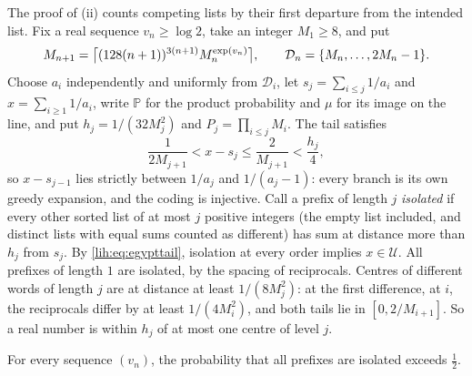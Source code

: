 The proof of (ii) counts competing lists by their first departure from the intended list. Fix a real
sequence $v_n\ge\log2$, take an integer $M_1\ge8$, and put
\begin{equation}\label{lih:eq:egyptscale}
 M_{n+1}=\ceil[\big]{(128(n+1))^{3(n+1)}M_n^{\exp(v_n)}},\qquad\mathcal D_n=\set{M_n,\dots,2M_n-1}.
\end{equation}
Choose $a_i$ independently and uniformly from $\mathcal D_i$, let $s_j=\sum_{i\le j}1/a_i$ and $x=\sum_{i\ge1}1/a_i$, write
$\mathbb P$ for the product probability and $\mu$ for its image on the line, and put $h_j=1/(32M_j^2)$ and
$P_j=\prod_{i\le j}M_i$. The tail satisfies
\begin{equation}\label{lih:eq:egypttail}
 \frac1{2M_{j+1}}<x-s_j\le\frac2{M_{j+1}}<\frac{h_j}4,
\end{equation}
so $x-s_{j-1}$ lies strictly between $1/a_j$ and $1/(a_j-1)$: every branch is its own greedy expansion, and
the coding is injective. Call a prefix of length $j$ \emph{isolated} if every other sorted list of at most
$j$ positive integers (the empty list included, and distinct lists with equal sums counted as
different) has sum at distance more than $h_j$ from $s_j$. By \eqref{lih:eq:egypttail}, isolation at every
order implies $x\in\mathcal U$. All prefixes of length $1$ are isolated, by the spacing of reciprocals. Centres of
different words of length $j$ are at distance at least $1/(8M_j^2)$: at the first difference, at $i$, the
reciprocals differ by at least $1/(4M_i^2)$, and both tails lie in $[0,2/M_{i+1}]$. So a real number is
within $h_j$ of at most one centre of level $j$.

\begin{proposition}\label{lih:prop:egyptisolated}
For every sequence $(v_n)$, the probability that all prefixes are isolated exceeds $\frac12$.
\end{proposition}

